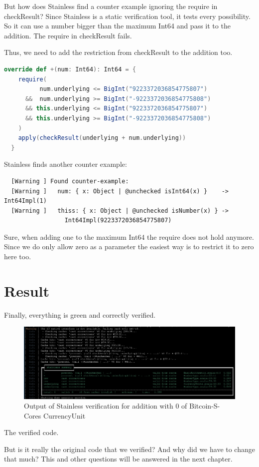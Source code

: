 But how does Stainless find a counter example ignoring the require in checkResult?
Since Stainless is a static verification tool, it tests every possibility.
So it can use a number bigger than the maximum Int64 and pass it to the addition.
The require in checkResult fails.

Thus, we need to add the restriction from checkResult to the addition too.
\begin{lstlisting}[language=scala]
  override def +(num: Int64): Int64 = {
    require(
          num.underlying <= BigInt("9223372036854775807")
      &&  num.underlying >= BigInt("-9223372036854775808")
      && this.underlying <= BigInt("9223372036854775807")
      && this.underlying >= BigInt("-9223372036854775808")
    )
    apply(checkResult(underlying + num.underlying))
  }
\end{lstlisting}

Stainless finds another counter example:
{\footnotesize\begin{verbatim}
  [Warning ] Found counter-example:
  [Warning ]   num: { x: Object | @unchecked isInt64(x) }    -> Int64Impl(1)
  [Warning ]   thiss: { x: Object | @unchecked isNumber(x) } ->
                 Int64Impl(9223372036854775807)
\end{verbatim}}

Sure, when adding one to the maximum Int64 the require does not hold anymore.
Since we do only allow zero as a parameter the easiest way is to restrict it to zero here too.


\section{Result}

Finally, everything is green and correctly verified.
\begin{figure}[H]
	\centering
		\includegraphics[scale=0.45]{images/final_verify_output.png}
	\caption{Output of Stainless verification for addition with 0 of Bitcoin-S-Cores CurrencyUnit}
	\label{fig:output1}
\end{figure}

The verified code.


But is it really the original code that we verified?
And why did we have to change that much?
This and other questions will be answered in the next chapter.
